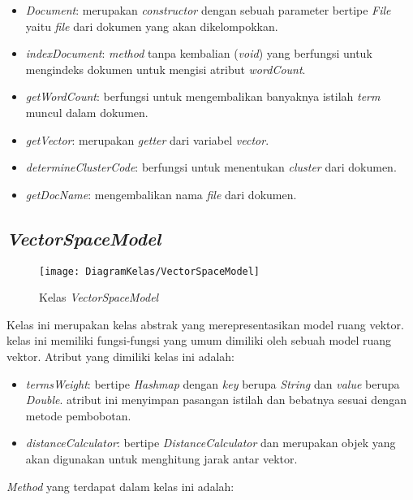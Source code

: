 \begin{itemize}
	\item \textit{Document}: merupakan \textit{constructor} dengan sebuah parameter bertipe \textit{File} yaitu \textit{file} dari dokumen yang akan dikelompokkan.
	\item \textit{indexDocument}: \textit{method} tanpa kembalian (\textit{void}) yang berfungsi untuk mengindeks dokumen untuk mengisi atribut \textit{wordCount}.
	\item \textit{getWordCount}: berfungsi untuk mengembalikan banyaknya istilah \textit{term} muncul dalam dokumen.
	\item \textit{getVector}: merupakan \textit{getter} dari variabel \textit{vector}.
	\item \textit{determineClusterCode}: berfungsi untuk menentukan \textit{cluster} dari dokumen.
	\item \textit{getDocName}: mengembalikan nama \textit{file} dari dokumen.
\end{itemize}

\subsection{\textit{VectorSpaceModel}}

\begin{figure}[h]
	\begin{center}
		\texttt{[image: DiagramKelas/VectorSpaceModel]}
		\caption{Kelas \textit{VectorSpaceModel}}
		\label{fig:kelasVSM}
	\end{center}
\end{figure}

Kelas ini merupakan kelas abstrak yang merepresentasikan model ruang vektor. kelas ini memiliki fungsi-fungsi yang umum dimiliki oleh sebuah model ruang vektor. Atribut yang dimiliki kelas ini adalah:

\begin{itemize}
	\item \textit{termsWeight}: bertipe \textit{Hashmap} dengan \textit{key} berupa \textit{String} dan \textit{value} berupa \textit{Double}. atribut ini menyimpan pasangan istilah dan bebatnya sesuai dengan metode pembobotan.
	\item \textit{distanceCalculator}: bertipe \textit{DistanceCalculator} dan merupakan objek yang akan digunakan untuk menghitung jarak antar vektor.
\end{itemize}

\textit{Method} yang terdapat dalam kelas ini adalah:

